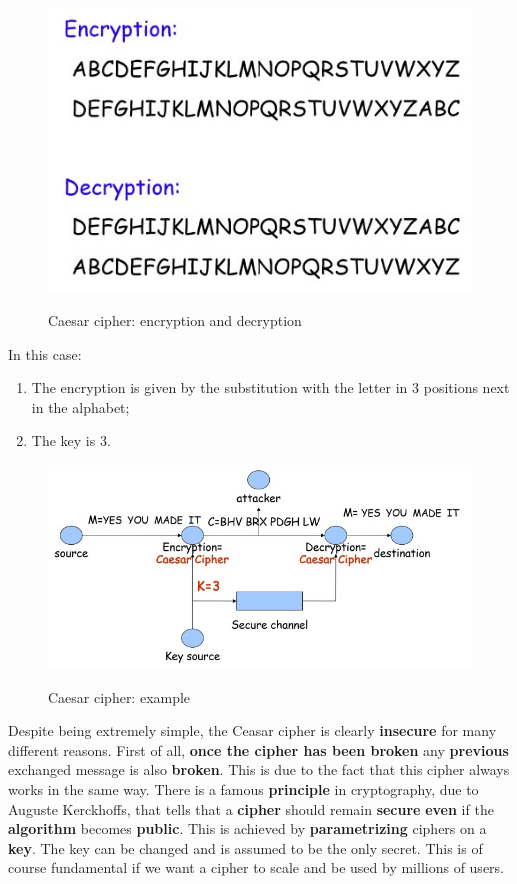 \begin{figure}[h!]
        \centering
        \includegraphics[scale = 1.2]{img/cl4.jpg}
        \label{cl4}
        \caption{Caesar cipher: encryption and decryption}
\end{figure}

In this case:

\begin{enumerate}
    \item The encryption is given by the substitution with the letter in 3 positions next in the alphabet;
    \item The key is 3.
\end{enumerate}


\begin{figure}[h!]
        \centering
        \includegraphics[scale = 1.2]{img/cl5.jpg}
        \label{cl5}
        \caption{Caesar cipher: example}
\end{figure}

Despite being extremely simple, the Ceasar cipher is clearly \textbf{insecure} for many different reasons. First of all, \textbf{once the cipher has been broken} any \textbf{previous} exchanged message is also \textbf{broken}. This is due to the fact that this cipher always works in the same way. There is a famous \textbf{principle} in cryptography, due to Auguste Kerckhoffs, that tells that a \textbf{cipher} should remain \textbf{secure} \textbf{even} if the \textbf{algorithm} becomes \textbf{public}. This is achieved by \textbf{parametrizing} ciphers on a \textbf{key}. The key can be changed and is assumed to be the only secret. This is of course fundamental if we want a cipher to scale and be used by millions of users.

